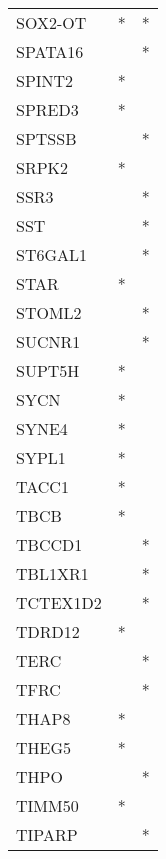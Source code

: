 \begin{longtable}{lcc}
SOX2-OT          &              * &          * \\
SPATA16          &                &          * \\
SPINT2           &              * &            \\
SPRED3           &              * &            \\
SPTSSB           &                &          * \\
SRPK2            &              * &            \\
SSR3             &                &          * \\
SST              &                &          * \\
ST6GAL1          &                &          * \\
STAR             &              * &            \\
STOML2           &                &          * \\
SUCNR1           &                &          * \\
SUPT5H           &              * &            \\
SYCN             &              * &            \\
SYNE4            &              * &            \\
SYPL1            &              * &            \\
TACC1            &              * &            \\
TBCB             &              * &            \\
TBCCD1           &                &          * \\
TBL1XR1          &                &          * \\
TCTEX1D2         &                &          * \\
TDRD12           &              * &            \\
TERC             &                &          * \\
TFRC             &                &          * \\
THAP8            &              * &            \\
THEG5            &              * &            \\
THPO             &                &          * \\
TIMM50           &              * &            \\
TIPARP           &                &          * \\

\end{longtable}
